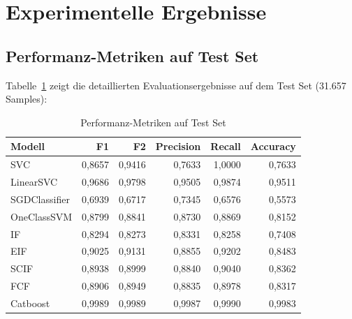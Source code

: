 \documentclass[12pt,oneside]{article}
\begin{document}
	\section{Experimentelle Ergebnisse}
	\label{sec:results}
	\subsection{Performanz-Metriken auf Test Set}
	Tabelle~\ref{tab:validation-results} zeigt die detaillierten Evaluationsergebnisse auf dem Test Set (31.657 Samples):
	\begin{table}[h]
		\centering
		\caption{Performanz-Metriken auf Test Set}
		\label{tab:validation-results}
		\begin{tabular}{lrrrrr}
			\toprule
			\textbf{Modell} & \textbf{F1} & \textbf{F2} & \textbf{Precision} & \textbf{Recall} & \textbf{Accuracy} \\
			\midrule
			SVC           & 0,8657 & 0,9416 & 0,7633 & 1,0000 & 0,7633 \\
			LinearSVC     & 0,9686 & 0,9798 & 0,9505 & 0,9874 & 0,9511 \\
			SGDClassifier & 0,6939 & 0,6717 & 0,7345 & 0,6576 & 0,5573 \\
			OneClassSVM	  & 0,8799 & 0,8841 & 0,8730 & 0,8869 & 0,8152 \\
			IF	 		  & 0,8294 & 0,8273 & 0,8331 & 0,8258 & 0,7408 \\
			EIF	 		  & 0,9025 & 0,9131 & 0,8855 & 0,9202 & 0,8483 \\
			SCIF	 	  & 0,8938 & 0,8999 & 0,8840 & 0,9040 & 0,8362 \\
			FCF	 		  & 0,8906 & 0,8949 & 0,8835 & 0,8978 & 0,8317 \\
			Catboost	  & 0,9989 & 0,9989 & 0,9987 & 0,9990 & 0,9983 \\
			\bottomrule
		\end{tabular}
	\end{table}
	
\end{document}
